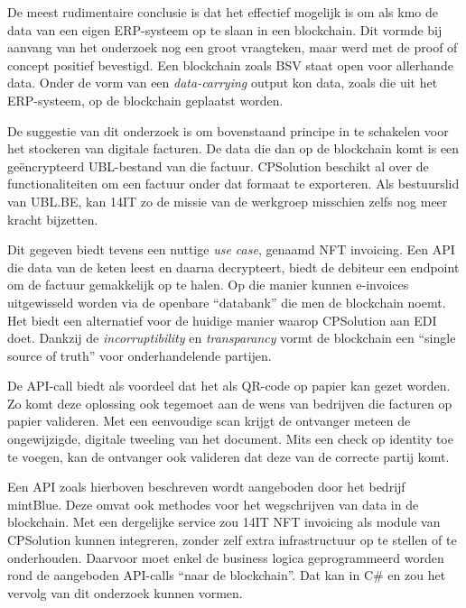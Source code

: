 De meest rudimentaire conclusie is dat het effectief mogelijk is om als kmo de data van een eigen ERP-systeem op te slaan in een blockchain. Dit vormde bij aanvang van het onderzoek nog een groot vraagteken, maar werd met de proof of concept positief bevestigd. Een blockchain zoals BSV staat open voor allerhande data. Onder de vorm van een \textit{data-carrying} output kon data, zoals die uit het ERP-systeem, op de blockchain geplaatst worden. 

De suggestie van dit onderzoek is om bovenstaand principe in te schakelen voor het stockeren van digitale facturen. De data die dan op de blockchain komt is een geëncrypteerd UBL-bestand van die factuur. CPSolution beschikt al over de functionaliteiten om een factuur onder dat formaat te exporteren. Als bestuurslid van UBL.BE, kan 14IT zo de missie van de werkgroep misschien zelfs nog meer kracht bijzetten.

Dit gegeven biedt tevens een nuttige \textit{use case}, genaamd NFT invoicing. Een API die data van de keten leest en daarna decrypteert, biedt de debiteur een endpoint om de factuur gemakkelijk op te halen. Op die manier kunnen e-invoices uitgewisseld worden via de openbare ``databank'' die men de blockchain noemt. Het biedt een alternatief voor de huidige manier waarop CPSolution aan EDI doet. Dankzij de \textit{incorruptibility} en \textit{transparancy} vormt de blockchain een ``single source of truth'' voor onderhandelende partijen.

De API-call biedt als voordeel dat het als QR-code op papier kan gezet worden. Zo komt deze oplossing ook tegemoet aan de wens van bedrijven die facturen op papier valideren. Met een eenvoudige scan krijgt de ontvanger meteen de ongewijzigde, digitale tweeling van het document. Mits een check op identity toe te voegen, kan de ontvanger ook valideren dat deze van de correcte partij komt.

Een API zoals hierboven beschreven wordt aangeboden door het bedrijf mintBlue. Deze omvat ook methodes voor het wegschrijven van data in de blockchain. Met een dergelijke service zou 14IT NFT invoicing als module van CPSolution kunnen integreren, zonder zelf extra infrastructuur op te stellen of te onderhouden. Daarvoor moet enkel de business logica geprogrammeerd worden rond de aangeboden API-calls ``naar de blockchain''. Dat kan in C\# en zou het vervolg van dit onderzoek kunnen vormen.